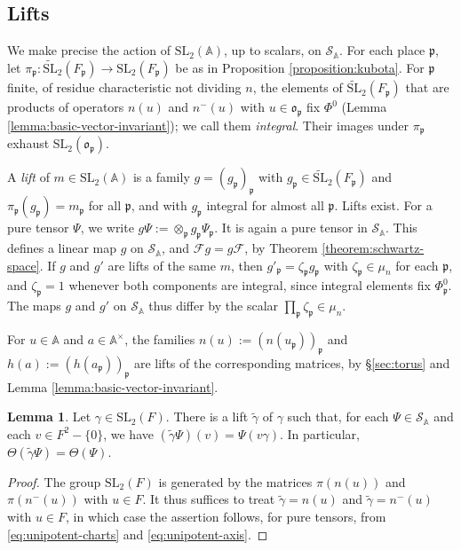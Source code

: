 \documentclass[reqno]{amsart}
\theoremstyle{plain}
\theoremstyle{definition}
\theoremstyle{itplain}
\newtheorem{lemma}[theorem]{Lemma}
\numberwithin{equation}{section}
\numberwithin{theorem}{section}
\begin{document}
\subsection{Lifts}\label{sec:rational-lifts}
We make precise the action of $\mathrm{SL}_2(\mathbb{A})$, up to scalars, on $\mathcal{S}_{\mathbb{A}}$.  For each place $\mathfrak{p}$, let $\pi_{\mathfrak{p}} : \widetilde{\mathrm{SL}}_2(F_{\mathfrak{p}}) \rightarrow \mathrm{SL}_2(F_{\mathfrak{p}})$ be as in Proposition \ref{proposition:kubota}.  For $\mathfrak{p}$ finite, of residue characteristic not dividing $n$, the elements of $\widetilde{\mathrm{SL}}_2(F_{\mathfrak{p}})$ that are products of operators $n(u)$ and $n^-(u)$ with $u \in \mathfrak{o}_{\mathfrak{p}}$ fix $\Phi^0$ (Lemma \ref{lemma:basic-vector-invariant}); we call them \emph{integral}.  Their images under $\pi_{\mathfrak{p}}$ exhaust $\mathrm{SL}_2(\mathfrak{o}_{\mathfrak{p}})$.

A \emph{lift} of $m \in \mathrm{SL}_2(\mathbb{A})$ is a family $g = (g_{\mathfrak{p}})_{\mathfrak{p}}$ with $g_{\mathfrak{p}} \in \widetilde{\mathrm{SL}}_2(F_{\mathfrak{p}})$ and $\pi_{\mathfrak{p}}(g_{\mathfrak{p}}) = m_{\mathfrak{p}}$ for all $\mathfrak{p}$, and with $g_{\mathfrak{p}}$ integral for almost all $\mathfrak{p}$.  Lifts exist.  For a pure tensor $\Psi$, we write $g \Psi := \otimes_{\mathfrak{p}} g_{\mathfrak{p}} \Psi_{\mathfrak{p}}$.  It is again a pure tensor in $\mathcal{S}_{\mathbb{A}}$.  This defines a linear map $g$ on $\mathcal{S}_{\mathbb{A}}$, and $\mathcal{F} g = g \mathcal{F}$, by Theorem \ref{theorem:schwartz-space}.  If $g$ and $g'$ are lifts of the same $m$, then $g'_{\mathfrak{p}} = \zeta_{\mathfrak{p}} g_{\mathfrak{p}}$ with $\zeta_{\mathfrak{p}} \in \mu_n$ for each $\mathfrak{p}$, and $\zeta_{\mathfrak{p}} = 1$ whenever both components are integral, since integral elements fix $\Phi_{\mathfrak{p}}^0$.  The maps $g$ and $g'$ on $\mathcal{S}_{\mathbb{A}}$ thus differ by the scalar $\prod_{\mathfrak{p}} \zeta_{\mathfrak{p}} \in \mu_n$.

For $u \in \mathbb{A}$ and $a \in \mathbb{A}^\times$, the families $n(u) := (n(u_{\mathfrak{p}}))_{\mathfrak{p}}$ and $h(a) := (h(a_{\mathfrak{p}}))_{\mathfrak{p}}$ are lifts of the corresponding matrices, by \S\ref{sec:torus} and Lemma \ref{lemma:basic-vector-invariant}.

\begin{lemma}\label{lemma:rational-invariance}
  Let $\gamma \in \mathrm{SL}_2(F)$.  There is a lift $\tilde{\gamma}$ of $\gamma$ such that, for each $\Psi \in \mathcal{S}_{\mathbb{A}}$ and each $v \in F^2 - \{0\}$, we have $(\tilde{\gamma} \Psi)(v) = \Psi(v \gamma)$.  In particular, $\Theta(\tilde{\gamma} \Psi) = \Theta(\Psi)$.
\end{lemma}
\begin{proof}
  The group $\mathrm{SL}_2(F)$ is generated by the matrices $\pi(n(u))$ and $\pi(n^-(u))$ with $u \in F$.  It thus suffices to treat $\tilde{\gamma} = n(u)$ and $\tilde{\gamma} = n^-(u)$ with $u \in F$, in which case the assertion follows, for pure tensors, from \eqref{eq:unipotent-charts} and \eqref{eq:unipotent-axis}.
\end{proof}
\end{document}
